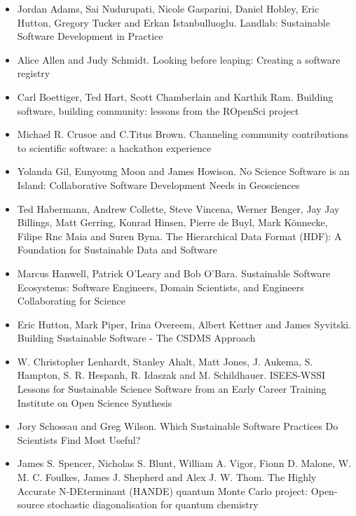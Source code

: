 \documentclass[11pt, oneside]{amsart}
\begin{document}
\begin{itemize}
\item Jordan Adams, Sai Nudurupati, Nicole Gasparini, Daniel Hobley, Eric
Hutton, Gregory Tucker and Erkan Istanbulluoglu. Landlab: Sustainable Software
Development in Practice ~\cite{wssspe2_adams}

\item Alice Allen and Judy Schmidt. Looking before leaping: Creating a software
registry~\cite{wssspe2_allen}

\item Carl Boettiger, Ted Hart, Scott Chamberlain and Karthik Ram. Building
software, building community: lessons from the {ROpenSci}
project~\cite{wssspe2_boettiger}

\item Michael R. Crusoe and C.Titus Brown. Channeling community contributions to
scientific software: a hackathon experience~\cite{wssspe2_crusoe}

\item Yolanda Gil, Eunyoung Moon and James Howison. No Science Software is an
Island: Collaborative Software Development Needs in
Geosciences~\cite{wssspe2_gil}

\item Ted Habermann, Andrew Collette, Steve Vincena, Werner Benger, Jay Jay
Billings, Matt Gerring, Konrad Hinsen, Pierre de Buyl, Mark K\"{o}nnecke, Filipe
Rnc Maia and Suren Byna. The Hierarchical Data Format ({HDF}): A Foundation for
Sustainable Data and Software~\cite{wssspe2_habermann}

\item Marcus Hanwell, Patrick O'Leary and Bob O'Bara. Sustainable Software
Ecosystems: Software Engineers, Domain Scientists, and Engineers Collaborating
for Science~\cite{wssspe2_hanwell}

\item Eric Hutton, Mark Piper, Irina Overeem, Albert Kettner and James Syvitski.
Building Sustainable Software - The {CSDMS} Approach~\cite{wssspe2_hutton}

\item W. Christopher Lenhardt, Stanley Ahalt, Matt Jones, J. Aukema, S. Hampton,
S. R. Hespanh, R. Idaszak and M. Schildhauer. {ISEES-WSSI} Lessons for
Sustainable Science Software from an Early Career Training Institute on Open
Science Synthesis~\cite{wssspe2_lenhardt}

\item Jory Schossau and Greg Wilson. Which Sustainable Software Practices Do
Scientists Find Most Useful?~\cite{wssspe2_schossau}

\item James S. Spencer, Nicholas S. Blunt, William A. Vigor, Fionn D. Malone, W.
M. C. Foulkes, James J. Shepherd and Alex J. W. Thom. The {H}ighly {A}ccurate
{N-DE}terminant ({HANDE}) quantum {Monte Carlo} project: Open-source stochastic
diagonalisation for quantum chemistry~\cite{wssspe2_spencer}
\end{itemize}
\end{document}
